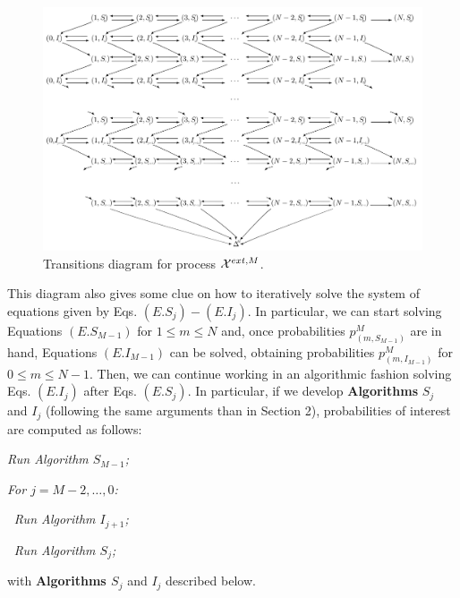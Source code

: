 \documentclass[preprint,12pt]{elsarticle}
\begin{document}
\begin{figure}[h!]
\centering
 \includegraphics[width=\textwidth]{Figure3_new.jpg}
\caption{Transitions diagram for process ${\cal X}^{ext,M}$.}
\label{fig:3new}
\end{figure}

\par This diagram also gives some clue on how to iteratively solve the system of equations given by Eqs. $(E.S_j)-(E.I_j)$. In particular, we can start
solving Equations $(E.S_{M-1})$ for $1\leq m\leq N$ and, once probabilities $p^M_{(m,S_{M-1})}$ are in hand, Equations $(E.I_{M-1})$ can be solved, obtaining
probabilities $p^M_{(m,I_{M-1})}$ for $0\leq m\leq N-1$. Then, we can continue working in an algorithmic fashion solving Eqs. $(E.I_j)$ after Eqs.
$(E.S_j)$. In particular, if we develop {\bf Algorithms} $S_j$ and $I_j$ (following the same arguments than in Section 2), probabilities of interest
are computed as follows:

\begin{description}
  \item \it Run Algorithm $S_{M-1}$;
  \item \it For $j=M-2,\dots,0$:
  \item $~$\hspace{0.5cm} \it Run Algorithm $I_{j+1}$;
  \item $~$\hspace{0.5cm} \it Run Algorithm $S_{j}$;
\end{description}

\par\noindent with {\bf Algorithms $S_j$} and $I_j$ described below.\\
\end{document}
